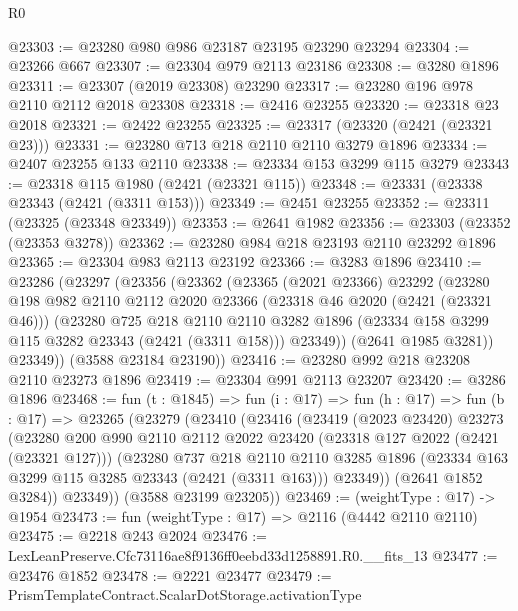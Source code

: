\begin{lexlean}{R0}
\begin{coremodule}
@23303 := @23280 @980 @986 @23187 @23195 @23290 @23294
@23304 := @23266 @667
@23307 := @23304 @979 @2113 @23186
@23308 := @3280 @1896
@23311 := @23307 (@2019 @23308) @23290
@23317 := @23280 @196 @978 @2110 @2112 @2018 @23308
@23318 := @2416 @23255
@23320 := @23318 @23 @2018
@23321 := @2422 @23255
@23325 := @23317 (@23320 (@2421 (@23321 @23)))
@23331 := @23280 @713 @218 @2110 @2110 @3279 @1896
@23334 := @2407 @23255 @133 @2110
@23338 := @23334 @153 @3299 @115 @3279
@23343 := @23318 @115 @1980 (@2421 (@23321 @115))
@23348 := @23331 (@23338 @23343 (@2421 (@3311 @153)))
@23349 := @2451 @23255
@23352 := @23311 (@23325 (@23348 @23349))
@23353 := @2641 @1982
@23356 := @23303 (@23352 (@23353 @3278))
@23362 := @23280 @984 @218 @23193 @2110 @23292 @1896
@23365 := @23304 @983 @2113 @23192
@23366 := @3283 @1896
@23410 := @23286
    (@23297
      (@23356
        (@23362
          (@23365
            (@2021 @23366)
            @23292
            (@23280
              @198
              @982
              @2110
              @2112
              @2020
              @23366
              (@23318 @46 @2020 (@2421 (@23321 @46)))
              (@23280
                @725
                @218
                @2110
                @2110
                @3282
                @1896
                (@23334 @158 @3299 @115 @3282 @23343 (@2421 (@3311 @158)))
                @23349))
            (@2641 @1985 @3281))
          @23349))
      (@3588 @23184 @23190))
@23416 := @23280 @992 @218 @23208 @2110 @23273 @1896
@23419 := @23304 @991 @2113 @23207
@23420 := @3286 @1896
@23468 := fun (t : @1845) =>
  fun (i : @17) =>
  fun (h : @17) =>
  fun (b : @17) =>
  @23265
    (@23279
      (@23410
        (@23416
          (@23419
            (@2023 @23420)
            @23273
            (@23280
              @200
              @990
              @2110
              @2112
              @2022
              @23420
              (@23318 @127 @2022 (@2421 (@23321 @127)))
              (@23280
                @737
                @218
                @2110
                @2110
                @3285
                @1896
                (@23334 @163 @3299 @115 @3285 @23343 (@2421 (@3311 @163)))
                @23349))
            (@2641 @1852 @3284))
          @23349))
      (@3588 @23199 @23205))
@23469 := (weightType : @17) -> @1954
@23473 := fun (weightType : @17) => @2116 (@4442 @2110 @2110)
@23475 := @2218 @243 @2024
@23476 := LexLeanPreserve.Cfc73116ae8f9136ff0eebd33d1258891.R0.__fits_13
@23477 := @23476 @1852
@23478 := @2221 @23477
@23479 := PrismTemplateContract.ScalarDotStorage.activationType

\end{coremodule}
\end{lexlean}
